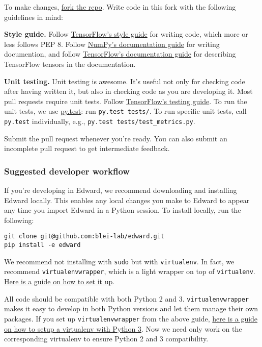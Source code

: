 To make changes,
\href{https://help.github.com/articles/working-with-forks/}{fork the repo}.
Write code in this fork with the following guidelines in mind:

\textbf{Style guide.}
Follow
\href{https://www.tensorflow.org/versions/master/how_tos/style_guide.html}{TensorFlow's
style guide}
for writing code, which more or less follows PEP 8.
Follow
\href{https://github.com/numpy/numpy/blob/master/doc/HOWTO_DOCUMENT.rst.txt}
{NumPy's documentation guide}
for writing documention,
and follow
\href{https://www.tensorflow.org/versions/master/how_tos/documentation/index.html}{TensorFlow's documentation guide}
for describing TensorFlow tensors in the documentation.

\textbf{Unit testing.}
Unit testing is awesome. It's useful not only
for checking code after having written it, but also in checking code
as you are developing it.
Most pull requests require unit tests.
Follow
\href{https://www.tensorflow.org/versions/master/api_docs/python/test.html}
{TensorFlow's testing guide}.
To run the unit tests, we use
\href{http://doc.pytest.org/}{py.test}:
run \texttt{py.test tests/}.
To run specific unit tests, call \texttt{py.test} individually, e.g., \texttt{py.test tests/test_metrics.py}.

Submit the pull request whenever you're ready. You can also submit an
incomplete pull request to get intermediate feedback.

\subsubsection{Suggested developer workflow}\label{suggested-workflow}

If you're developing in Edward,
we recommend downloading and installing Edward locally. This enables
any local changes you make to Edward to appear any time you
import Edward in a Python session. To install locally, run the
following:

\begin{verbatim}
git clone git@github.com:blei-lab/edward.git
pip install -e edward
\end{verbatim}

We recommend not installing with \texttt{sudo} but with
\texttt{virtualenv}. In fact, we recommend
\texttt{virtualenvwrapper}, which is a light wrapper on top of
\texttt{virtualenv}.
\href{http://docs.python-guide.org/en/latest/starting/install/osx/}
{Here is a guide on how to set it up}.

All code should be compatible with both Python 2 and 3.
\texttt{virtualenvwrapper} makes it easy to develop in both Python versions
and let them manage their own packages.
If you set up \texttt{virtualenvwrapper} from the above guide,
\href{http://www.marinamele.com/2014/07/install-python3-on-mac-os-x-and-use-virtualenv-and-virtualenvwrapper.html}
{here is a guide on how to setup a virtualenv with Python 3}.
Now we need only work on the corresponding virtualenv to ensure Python
2 and 3 compatibility.

